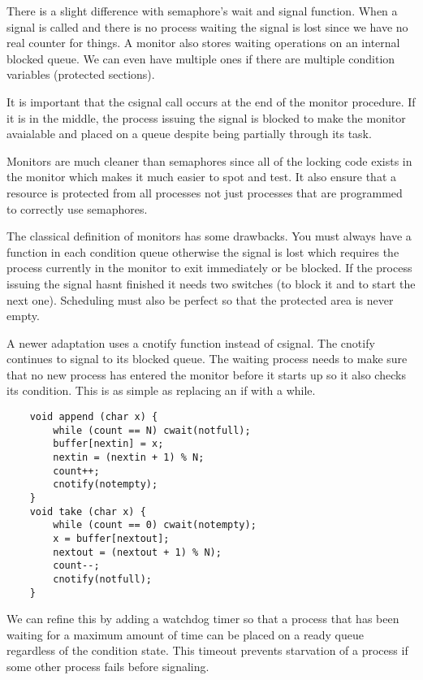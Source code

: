 \documentclass[12pt]{article}
\begin{document}
There is a slight difference with semaphore's wait and signal function. When a signal is called and there is no process waiting the signal is lost since we have no real counter for things. A monitor also stores waiting operations on an internal blocked queue. We can even have multiple ones if there are multiple condition variables (protected sections).

It is important that the csignal call occurs at the end of the monitor procedure. If it is in the middle, the process issuing the signal is blocked to make the monitor avaialable and placed on a queue despite being partially through its task.

Monitors are much cleaner than semaphores since all of the locking code exists in the monitor which makes it much easier to spot and test. It also ensure that a resource is protected from all processes not just processes that are programmed to correctly use semaphores.

The classical definition of monitors has some drawbacks. You must always have a function in each condition queue otherwise the signal is lost which requires the process currently in the monitor to exit immediately or be blocked. If the process issuing the signal hasnt finished it needs two switches (to block it and to start the next one). Scheduling must also be perfect so that the protected area is never empty.

A newer adaptation uses a cnotify function instead of csignal. The cnotify continues to signal to its blocked queue. The waiting process needs to make sure that no new process has entered the monitor before it starts up so it also checks its condition. This is as simple as replacing an if with a while.

\begin{lstlisting}
    void append (char x) {
        while (count == N) cwait(notfull);
        buffer[nextin] = x;
        nextin = (nextin + 1) % N;
        count++;
        cnotify(notempty);
    }
    void take (char x) {
        while (count == 0) cwait(notempty);
        x = buffer[nextout];
        nextout = (nextout + 1) % N);
        count--;
        cnotify(notfull);
    }
\end{lstlisting}

We can refine this by adding a watchdog timer so that a process that has been waiting for a maximum amount of time can be placed on a ready queue regardless of the condition state. This timeout prevents starvation of a process if some other process fails before signaling.
\end{document}

